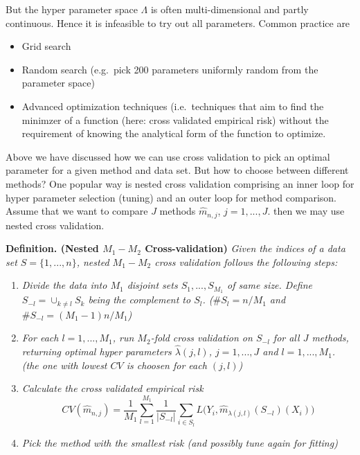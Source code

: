 \documentclass[a4paper,12pt,openany]{book}
\providecommand{\tightlist}{%
 \setlength{\itemsep}{0pt}\setlength{\parskip}{0pt}}
\begin{document}
But the hyper parameter space \(\Lambda\) is often multi-dimensional and partly continuous. Hence it is infeasible to try out all parameters. Common practice are

\begin{itemize}
\tightlist
\item
  Grid search
\item
  Random search (e.g.~pick 200 parameters uniformly random from the parameter space)
\item
  Advanced optimization techniques (i.e.~techniques that aim to find the minimzer of a function (here: cross validated empirical risk) without the requirement of knowing the analytical form of the function to optimize.
\end{itemize}

Above we have discussed how we can use cross validation to pick an optimal parameter for a given method and data set. But how to choose between different methods? One popular way is nested cross validation comprising an inner loop for hyper parameter selection (tuning) and an outer loop for method comparison. Assume that we want to compare \(J\) methods \(\hat{m}_{n,j}\), \(j=1,...,J\). then we may use nested cross validation.

\textbf{Definition. (Nested \(M_1-M_2\) Cross-validation)} \emph{Given the indices of a data set \(S=\{1,...,n\}\), nested \(M_1-M_2\) cross validation follows the following steps:}

\begin{enumerate}
\def\labelenumi{\arabic{enumi}.}
\tightlist
\item
  \emph{Divide the data into \(M_1\) disjoint sets \(S_1,...,S_{M_1}\) of same size. Define \(S_{-l}=\cup_{k\ne l}S_k\) being the complement to \(S_l\). (\(\#S_l=n/M_1\) and \(\#S_{-l}=(M_1-1)n/M_1\))}
\item
  \emph{For each \(l=1,...,M_1\), run \(M_2\)-fold cross validation on \(S_{-l}\) for all \(J\) methods, returning optimal hyper parameters \(\hat{\lambda}(j,l)\), \(j=1,...,J\) and \(l=1,...,M_1\). (the one with lowest \(CV\) is choosen for each \((j,l)\))}
\item
  \emph{Calculate the cross validated empirical risk}
  \[
    CV(\hat{m}_{n,j})=\frac{1}{M_1}\sum_{l=1}^{M_1}\frac{1}{\vert S_{-l}\vert}\sum_{i\in S_l}L\big(Y_i,\hat{m}_{\lambda(j,l)}(S_{-l})(X_i)\big)
    \]
\item
  \emph{Pick the method with the smallest risk (and possibly tune again for fitting)}
\end{enumerate}
\end{document}
